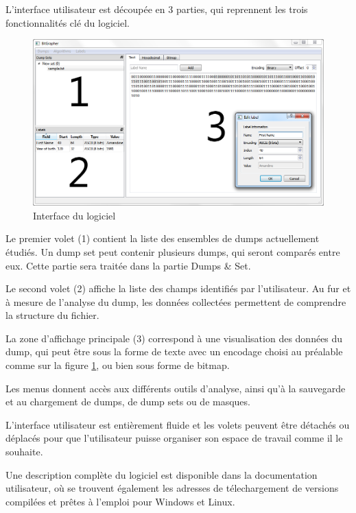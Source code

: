 L'interface utilisateur est découpée en 3 parties, qui reprennent les trois fonctionnalités clé du logiciel.

\begin{figure}[!h]
  \begin{center}
  \includegraphics[width=\textwidth]{interface.png}
  \caption{Interface du logiciel}
  \label{interface}
  \end{center}
\end{figure}

Le premier volet (1) contient la liste des ensembles de dumps actuellement étudiés. Un dump set peut contenir plusieurs dumps, qui seront comparés entre eux. Cette partie sera traitée dans la partie Dumps \& Set.

Le second volet (2) affiche la liste des champs identifiés par l'utilisateur. Au fur et à mesure de l'analyse du dump, les données collectées permettent de comprendre la structure du fichier.

La zone d'affichage principale (3) correspond à une visualisation des données du dump, qui peut être sous la forme de texte avec un encodage choisi au préalable comme sur la figure \ref{interface}, ou bien sous forme de bitmap.

Les menus donnent accès aux différents outils d'analyse, ainsi qu'à la sauvegarde et au chargement de dumps, de dump sets ou de masques.

L'interface utilisateur est entièrement fluide et les volets peuvent être détachés ou déplacés pour que l'utilisateur puisse organiser son espace de travail comme il le souhaite.

Une description complète du logiciel est disponible dans la documentation utilisateur, où se trouvent également les adresses de télechargement de versions compilées et prêtes à l'emploi pour Windows et Linux.
